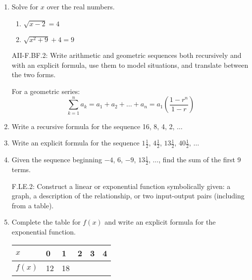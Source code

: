 \documentclass[12pt, twoside]{article}
\begin{document}
\begin{enumerate}[itemsep=0.5cm]
\item Solve for $x$ over the real numbers.
    \begin{multicols}{2}
    \begin{enumerate}[itemsep=0.5cm]
        \item $\sqrt{x-2}=4$
        \item $\sqrt{x^2+9} + 4 = 9$
    \end{enumerate}
    \end{multicols}

\newpage
AII-F.BF.2: Write arithmetic and geometric sequences both recursively and with an explicit formula, use them to model situations, and translate between the two forms.

For a geometric series:
$$\sum_{k=1}^{n} a_k = a_1 + a_2 + \ldots + a_n = a_1 \left( \frac{1-r^n}{1-r} \right)$$

\item Write a recursive formula for the sequence 16, 8, 4, 2, $\ldots$ \vspace{3cm}

\item Write an explicit formula for the sequence $1 \frac{1}{2}$, $4 \frac{1}{2}$, $13 \frac{1}{2}$, $40 \frac{1}{2}$, $\ldots$ \vspace{3cm}


\item Given the sequence beginning  $-4$, 6, $-9$, $13 \frac{1}{2}$, $\ldots$, find the sum of the first 9 terms. \vspace{3cm}

F.LE.2: Construct a linear or exponential function symbolically given: a graph, a description of the relationship, or two input-output pairs (including from a table).
\item Complete the table for $f(x)$ and write an explicit formula for the exponential function.
    \begin{center}
    \begin{tabular}{|p{1cm}|p{1cm}|p{1cm}|p{1cm}|p{1cm}|p{1cm}|}
        \hline
        $x$ & 0 & 1 & 2 & 3 & 4 \\
        \hline
        $f(x)$ & 12 & 18 & & & \\[0.25cm]
        \hline
    \end{tabular}
    \end{center}


\end{enumerate}
\end{document}
